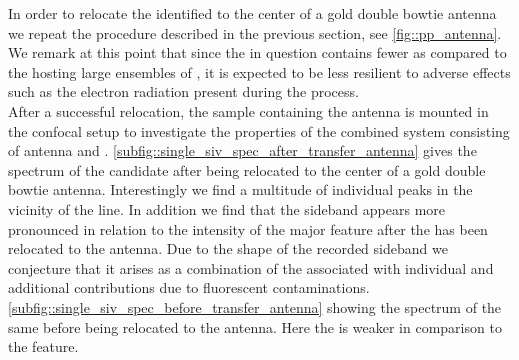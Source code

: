 				In order to relocate the identified \nd to the center of a gold double bowtie antenna we repeat the \pp procedure described in the previous section, see \autoref{fig::pp_antenna}. We remark at this point that since the \nd in question contains fewer \sivs as compared to the \nds hosting large ensembles of \sivs, it is expected to be less resilient to adverse effects such as the electron radiation present during the \pp process.
				\\
				After a successful relocation, the sample containing the antenna is mounted in the confocal setup to investigate the properties of the combined system consisting of antenna and \sivs. \autoref{subfig::single_siv_spec_after_transfer_antenna} gives the spectrum of the candidate \nd after being relocated to the center of a gold double bowtie antenna. Interestingly we find a multitude of individual peaks in the vicinity of the \siv \zpl line. In addition we find that the sideband appears more pronounced in relation to the intensity of the major feature after the \nd has been relocated to the antenna. Due to the shape of the recorded sideband we conjecture that it arises as a combination of the \psbs associated with individual \sivs and additional contributions due to fluorescent contaminations. \autoref{subfig::single_siv_spec_before_transfer_antenna} showing the spectrum of the same \nd before being relocated to the antenna. Here the \psb is weaker in comparison to the \zpl feature.


